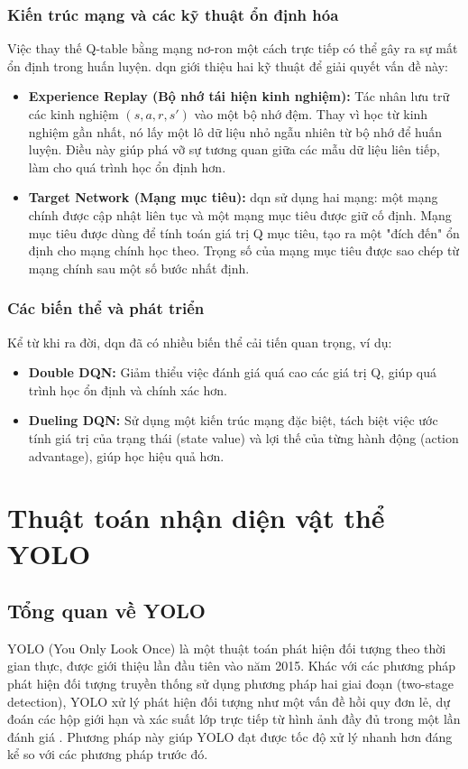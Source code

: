\subsubsection{Kiến trúc mạng và các kỹ thuật ổn định hóa}
Việc thay thế Q-table bằng mạng nơ-ron một cách trực tiếp có thể gây ra sự mất
ổn định trong huấn luyện. \ac{dqn} giới thiệu hai kỹ thuật để giải quyết
vấn đề này:
\begin{itemize}
    \item \textbf{Experience Replay (Bộ nhớ tái hiện kinh nghiệm):} Tác nhân lưu
        trữ các kinh nghiệm $(s, a, r, s')$ vào một bộ nhớ đệm. Thay vì học từ kinh
        nghiệm gần nhất, nó lấy một lô dữ liệu nhỏ ngẫu nhiên từ bộ nhớ để huấn
        luyện. Điều này giúp phá vỡ sự tương quan giữa các mẫu dữ liệu liên tiếp,
        làm cho quá trình học ổn định hơn.

    \item \textbf{Target Network (Mạng mục tiêu):} \ac{dqn} sử dụng hai mạng:
        một mạng chính được cập nhật liên tục và một mạng mục tiêu được giữ cố
        định. Mạng mục tiêu được dùng để tính toán giá trị Q mục tiêu, tạo ra
        một "đích đến" ổn định cho mạng chính học theo. Trọng số của mạng mục tiêu
        được sao chép từ mạng chính sau một số bước nhất định.
\end{itemize}

\subsubsection{Các biến thể và phát triển}
Kể từ khi ra đời, \ac{dqn} đã có nhiều biến thể cải tiến quan trọng, ví dụ:
\begin{itemize}
    \item \textbf{Double DQN:} Giảm thiểu việc đánh giá quá cao các giá trị Q, giúp
        quá trình học ổn định và chính xác hơn.

    \item \textbf{Dueling DQN:} Sử dụng một kiến trúc mạng đặc biệt, tách biệt việc
        ước tính giá trị của trạng thái (state value) và lợi thế của từng hành động
        (action advantage), giúp học hiệu quả hơn.
\end{itemize}

\section{Thuật toán nhận diện vật thể YOLO}
\subsection{Tổng quan về YOLO}
YOLO (You Only Look Once) là một thuật toán phát hiện đối tượng theo thời gian thực,
được giới thiệu lần đầu tiên vào năm 2015. Khác với các phương pháp phát hiện
đối tượng truyền thống sử dụng phương pháp hai giai đoạn (two-stage detection), YOLO
xử lý phát hiện đối tượng như một vấn đề hồi quy đơn lẻ, dự đoán các hộp giới
hạn và xác suất lớp trực tiếp từ hình ảnh đầy đủ trong một lần đánh giá
\cite{Redmon2016}. Phương pháp này giúp YOLO đạt được tốc độ xử lý nhanh hơn đáng
kể so với các phương pháp trước đó.

